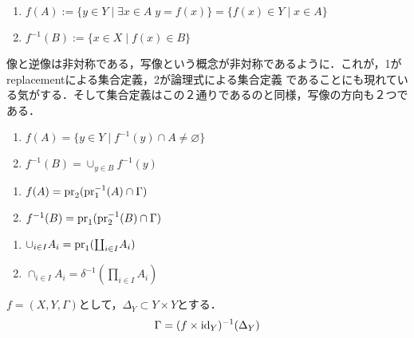 \documentclass[uplatex, 12pt, dvipdfmx]{jsreport}
\begin{document}
\begin{definition}\mbox{}
    \begin{enumerate}
        \item $f(A):=\{y\in Y\mid\exists x\in A\;y=f(x)\}=\{f(x)\in Y\mid x\in A\}$
        \item $f^{-1}(B):=\{x\in X\mid f(x)\in B\}$
    \end{enumerate}
\end{definition}
\begin{remark}
    像と逆像は非対称である，写像という概念が非対称であるように．これが，1がreplacementによる集合定義，2が論理式による集合定義
    であることにも現れている気がする．そして集合定義はこの２通りであるのと同様，写像の方向も２つである．
\end{remark}
\begin{proposition}[fiberの言葉による特徴付け]\mbox{}
    \begin{enumerate}
        \item $f(A)=\{y\in Y\mid f^{-1}(y)\cap A\ne\varnothing\}$
        \item $f^{-1}(B)=\cup_{y\in B}f^{-1}(y)$
    \end{enumerate}
\end{proposition}
\begin{proposition}[グラフと射影の言葉による特徴付け]\mbox{}
    \begin{enumerate}
        \item $f(A)=\mathrm{pr}_2(\mathrm{pr}_1^{-1}(A)\cap\Gamma)$
        \item $f^{-1}(B)=\mathrm{pr}_1(\mathrm{pr}_2^{-1}(B)\cap\Gamma)$
    \end{enumerate}
\end{proposition}

\begin{example}\mbox{}
    \begin{enumerate}
        \item $\cup_{i\in I}A_i=\pr_1(\coprod_{i\in I}A_i)$
        \item $\cap_{i\in I}A_i=\delta^{-1}(\prod_{i\in I}A_i)$
    \end{enumerate}
\end{example}

\begin{example}
    $f=(X,Y,\Gamma)$として，$\Delta_Y\subset Y\times Y$とする．
    \[\Gamma=(f\times\mathrm{id}_Y)^{-1}(\Delta_Y)\]
\end{example}
\end{document}
